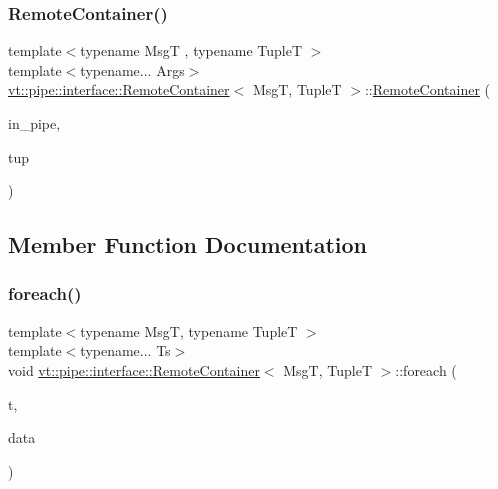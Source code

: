 \mbox{\label{structvt_1_1pipe_1_1interface_1_1_remote_container_afcd73686512c7d7d25beeb8a9f9d1c73}} 
\subsubsection{\texorpdfstring{Remote\+Container()}{RemoteContainer()}\hspace{0.1cm}{\footnotesize\ttfamily [2/2]}}
{\footnotesize\ttfamily template$<$typename MsgT , typename TupleT $>$ \\
template$<$typename... Args$>$ \\
\hyperlink{structvt_1_1pipe_1_1interface_1_1_remote_container}{vt\+::pipe\+::interface\+::\+Remote\+Container}$<$ MsgT, TupleT $>$\+::\hyperlink{structvt_1_1pipe_1_1interface_1_1_remote_container}{Remote\+Container} (\begin{DoxyParamCaption}\item[{\hyperlink{namespacevt_ac9852acda74d1896f48f406cd72c7bd3}{Pipe\+Type} const \&}]{in\+\_\+pipe,  }\item[{std\+::tuple$<$ Args... $>$}]{tup }\end{DoxyParamCaption})}



\subsection{Member Function Documentation}
\mbox{\label{structvt_1_1pipe_1_1interface_1_1_remote_container_a1e76b8bdf55de44a4daa54517036e3b4}} 
\subsubsection{\texorpdfstring{foreach()}{foreach()}\hspace{0.1cm}{\footnotesize\ttfamily [1/2]}}
{\footnotesize\ttfamily template$<$typename MsgT, typename TupleT $>$ \\
template$<$typename... Ts$>$ \\
void \hyperlink{structvt_1_1pipe_1_1interface_1_1_remote_container}{vt\+::pipe\+::interface\+::\+Remote\+Container}$<$ MsgT, TupleT $>$\+::foreach (\begin{DoxyParamCaption}\item[{std\+::tuple$<$ Ts... $>$ const \&}]{t,  }\item[{MsgT $\ast$}]{data }\end{DoxyParamCaption})\hspace{0.3cm}{\ttfamily [private]}}

